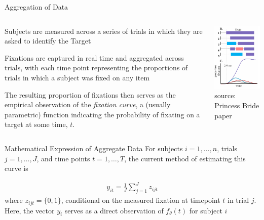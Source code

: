 \documentclass{beamer}
\begin{document}
\begin{frame}{Aggregation of Data}
\begin{columns}
\begin{column}{0.5\textwidth}
Subjects are measured across a series of trials in which they are asked to identify the Target \newline 

Fixations are captured in real time and aggregated across trials, with each time point representing the proportions of trials in which a subject was fixed on any item \newline 

The resulting proportion of fixations then serves as the empirical observation of the \textit{fixation curve}, a (usually parametric) function indicating the probability of fixating on a target at some time, $t$.
\end{column}
\begin{column}{0.5\textwidth}  %
\begin{center}
\includegraphics[scale=0.5]{img/bob_aggregate.png}
\\
{\tiny source: Princess Bride paper}
\end{center}
\end{column}
\end{columns}
\end{frame}

\begin{frame}{Mathematical Expression of Aggregate Data}
For subjects $i = 1, \dots, n$, trials $j = 1, \dots, J$, and time points $t = 1, \dots, T$, the current method of estimating this curve is 

\begin{align*}
y_{it} = \frac{1}{J} \sum_{j=1}^J z_{ijt}
\end{align*}
where $z_{ijt} = \{0,1\}$, conditional on the measured fixation at timepoint $t$ in trial $j$. \newline \\

Here, the vector $y_i$ serves as a direct observation of $f_{\theta}(t)$ for subject $i$ 
\end{frame}
\end{document}
